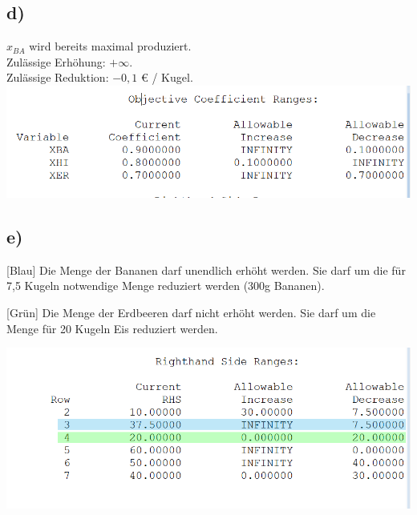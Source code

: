 \documentclass[a4paper,11pt]{article}
\begin{document}
\subsection*{d)}
$x_{BA}$ wird bereits maximal produziert.\\
Zulässige Erhöhung: $+ \infty$. \\
Zulässige Reduktion: $-0,1$ € / Kugel. \\

\vspace{4mm}
\includegraphics[width=.8\linewidth]{src/zielfunktion.png}

\subsection*{e)}

[Blau] Die Menge der Bananen darf unendlich erhöht werden. Sie darf um die für 7,5 Kugeln notwendige Menge reduziert werden (300g Bananen). \newline

[Grün] Die Menge der Erdbeeren darf nicht erhöht werden. Sie darf um die Menge für 20 Kugeln Eis reduziert werden.

\vspace{4mm}
\includegraphics[width=.8\linewidth]{src/restriktionen.png}
\end{document}
